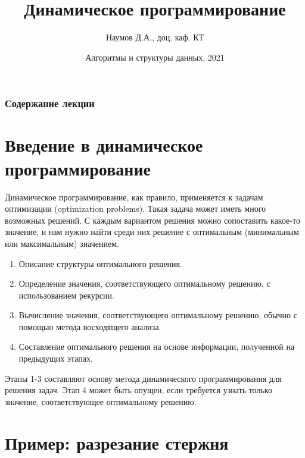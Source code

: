\documentclass{beamer}
\title[Динамическое программирование]{Динамическое программирование}
\author{Наумов Д.А., доц. каф. КТ}
\date[13.09.2021] {Алгоритмы и структуры данных, 2021}
\begin{document}
\begin{frame}
  \titlepage
\end{frame}

\begin{frame}
  \frametitle{Содержание лекции}
  \tableofcontents
\end{frame}

\section{Введение в динамическое программирование}

\begin{frame}[t]
	Динамическое программирование, как правило, применяется к задачам оптимизации (optimization problems). Такая задача может иметь много возможных решений. С каждым вариантом решения можно сопоставить какое-то значение, и нам нужно найти среди них решение с оптимальным (минимальным или максимальным) значением.
	\begin{enumerate}
	    \item Описание структуры оптимального решения.
        \item Определение значения, соответствующего оптимальному решению, с использованием рекурсии.
        \item Вычисление значения, соответствующего оптимальному решению, обычно с помощью метода восходящего анализа.
        \item Составление оптимального решения на основе информации, полученной на
предыдущих этапах.
	\end{enumerate}
	Этапы 1-3 составляют основу метода динамического программирования для решения задач. Этап 4 может быть опущен, если требуется узнать только значение, соответствующее оптимальному решению.
\end{frame}

\section{Пример: разрезание стержня}
\end{document}
